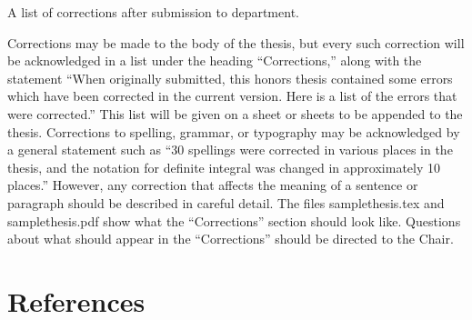 \documentclass[12pt, twoside]{amherstthesis}
\begin{document}
A list of corrections after submission to department.

Corrections may be made to the body of the thesis, but every such correction will be acknowledged in a list under the heading ``Corrections,'' along with the statement ``When originally submitted, this honors thesis contained some errors which have been corrected in the current version. Here is a list of the errors that were corrected.'' This list will be given on a sheet or sheets to be appended to the thesis. Corrections to spelling, grammar, or typography may be acknowledged by a general statement such as ``30 spellings were corrected in various places in the thesis, and the notation for definite integral was changed in approximately 10 places.'' However, any correction that affects the meaning of a sentence or paragraph should be described in careful detail. The files samplethesis.tex and samplethesis.pdf show what the ``Corrections'' section should look like. Questions about what should appear in the ``Corrections'' should be directed to the Chair.

\backmatter

\hypertarget{references}{%
\chapter*{References}\label{references}}

\noindent

\setlength{\parindent}{-0.20in}
\setlength{\leftskip}{0.20in}
\setlength{\parskip}{8pt}
\end{document}
